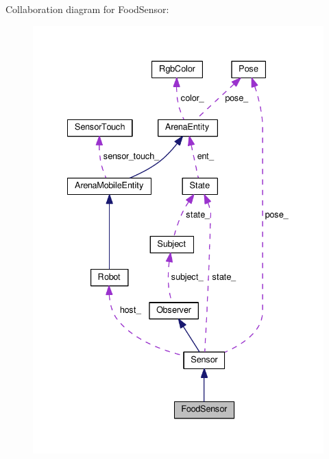 Collaboration diagram for Food\+Sensor\+:\nopagebreak
\begin{figure}[H]
\begin{center}
\leavevmode
\includegraphics[width=334pt]{classFoodSensor__coll__graph}
\end{center}
\end{figure}

